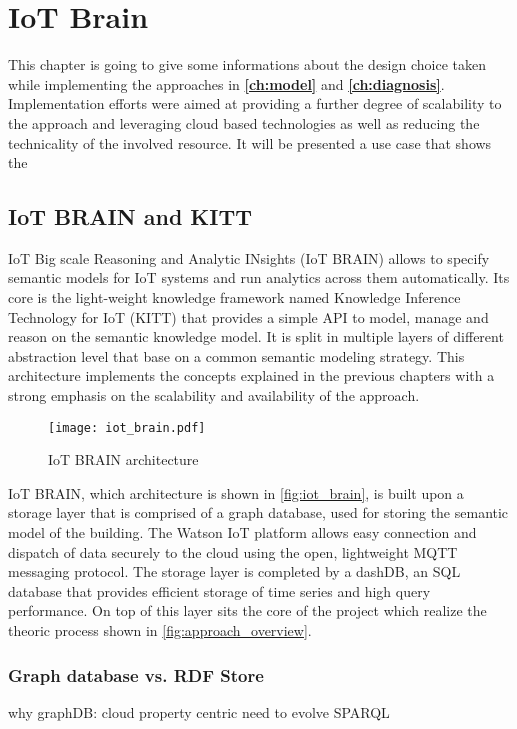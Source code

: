 \chapter{IoT Brain} \label{ch:framework}

This chapter is going to give some informations about the design choice taken while implementing the approaches in \textbf{\autoref{ch:model}} and \textbf{\autoref{ch:diagnosis}}. Implementation efforts were aimed at providing a further degree of scalability to the approach and leveraging cloud based technologies as well as reducing the technicality of the involved resource.
It will be presented a use case that shows the %

\section{IoT BRAIN and KITT}
IoT Big scale Reasoning and Analytic INsights (IoT BRAIN) allows to specify semantic models for IoT systems and run analytics across them automatically. Its core is the light-weight knowledge framework named Knowledge Inference Technology for IoT (KITT) that provides a simple API to model, manage and reason on the semantic knowledge model. It is split in multiple layers of different abstraction level that base on a common semantic modeling strategy.
This architecture implements the concepts explained in the previous chapters with a strong emphasis on the scalability and availability of the approach.

\begin{figure}
  \centering
  \texttt{[image: iot\_brain.pdf]}
  \caption{IoT BRAIN architecture}
  \label{fig:iot_brain}
\end{figure}

IoT BRAIN, which architecture is shown in \autoref{fig:iot_brain}, is built upon a storage layer that is comprised of a graph database, used for storing the semantic model of the building. The Watson IoT platform allows easy connection and dispatch of
data securely to the cloud using the open, lightweight MQTT messaging protocol. The storage layer is completed by a dashDB, an SQL database that provides efficient storage of time series and high query performance.
On top of this layer sits the core of the project which realize the theoric process shown in \autoref{fig:approach_overview}.

\subsection{Graph database vs. RDF Store}
why graphDB:
cloud
property centric
need to evolve SPARQL
